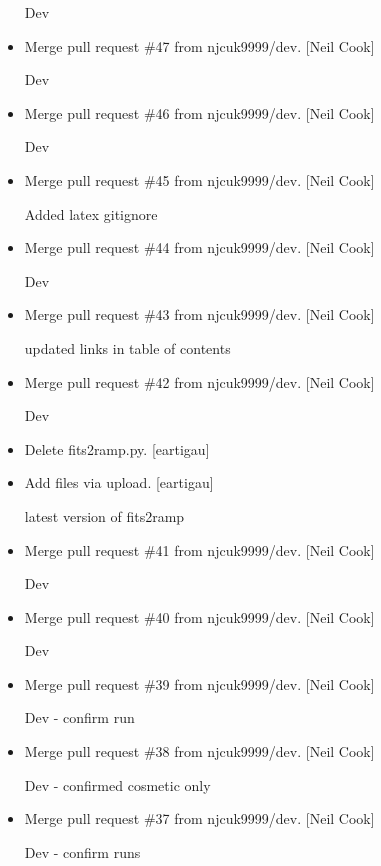 \documentclass[a4paper,10pt,english]{report}
\begin{document}
\begin{itemize}
Dev

\item {} 
Merge pull request \#47 from njcuk9999/dev. {[}Neil Cook{]}

Dev

\item {} 
Merge pull request \#46 from njcuk9999/dev. {[}Neil Cook{]}

Dev

\item {} 
Merge pull request \#45 from njcuk9999/dev. {[}Neil Cook{]}

Added latex gitignore

\item {} 
Merge pull request \#44 from njcuk9999/dev. {[}Neil Cook{]}

Dev

\item {} 
Merge pull request \#43 from njcuk9999/dev. {[}Neil Cook{]}

updated links in table of contents

\item {} 
Merge pull request \#42 from njcuk9999/dev. {[}Neil Cook{]}

Dev

\item {} 
Delete fits2ramp.py. {[}eartigau{]}

\item {} 
Add files via upload. {[}eartigau{]}

latest version of fits2ramp

\item {} 
Merge pull request \#41 from njcuk9999/dev. {[}Neil Cook{]}

Dev

\item {} 
Merge pull request \#40 from njcuk9999/dev. {[}Neil Cook{]}

Dev

\item {} 
Merge pull request \#39 from njcuk9999/dev. {[}Neil Cook{]}

Dev - confirm run

\item {} 
Merge pull request \#38 from njcuk9999/dev. {[}Neil Cook{]}

Dev - confirmed cosmetic only

\item {} 
Merge pull request \#37 from njcuk9999/dev. {[}Neil Cook{]}

Dev - confirm runs


\end{itemize}
\end{document}
